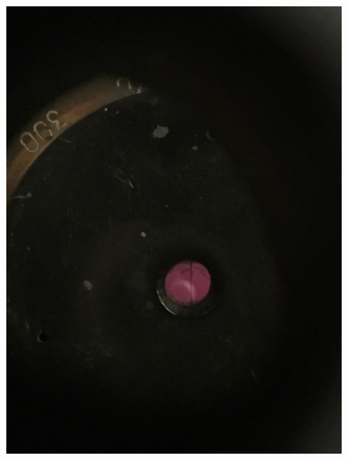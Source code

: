 \begin{figure}[h!]
\begin{minipage}{0.25\linewidth}
		\includegraphics[width=\linewidth]{biquarz/violet-violet.jpg}
	\end{minipage}
	\begin{minipage}{0.25\linewidth}

\end{minipage}
\end{figure}
